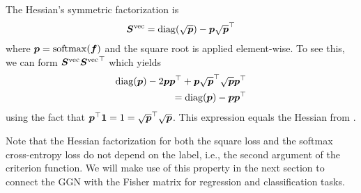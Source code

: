\begin{example}\label{ex:crossentropyloss_hessian_factorization}
  The Hessian's symmetric factorization is \citep[e.g.][]{papyan2019measurements}
  \begin{align*}
    {\bm{S}}^{\operatorname{vec}} = \operatorname{diag}(\sqrt{{\bm{p}}}) - {\bm{p}} \sqrt{{\bm{p}}}^{\top}
  \end{align*}
  where ${\bm{p}} = \mathrm{softmax}({\bm{f}})$ and the square root is applied element-wise.
  To see this, we can form ${\bm{S}}^{\operatorname{vec}} {{\bm{S}}^{\operatorname{vec}}}^{\top}$ which yields
  \begin{align*}
    \operatorname{diag}({\bm{p}}) - 2 {\bm{p}} {\bm{p}}^{\top} + {\bm{p}} \sqrt{{\bm{p}}}^{\top} \sqrt{{\bm{p}}} {\bm{p}}^{\top}
    \\
    = \operatorname{diag}({\bm{p}}) - {\bm{p}} {\bm{p}}^{\top}
  \end{align*}
  using the fact that ${\bm{p}}^{\top} {\bm{1}} = 1 = \sqrt{{\bm{p}}}^{\top} \sqrt{{\bm{p}}}$.
  This expression equals the Hessian from .
\end{example}
Note that the Hessian factorization for both the square loss and the softmax cross-entropy loss do not depend on the label, i.e., the second argument of the criterion function.
We will make use of this property in the next section to connect the GGN with the Fisher matrix for regression and classification tasks.

\switchcolumn[1]
\switchcolumn[0]

